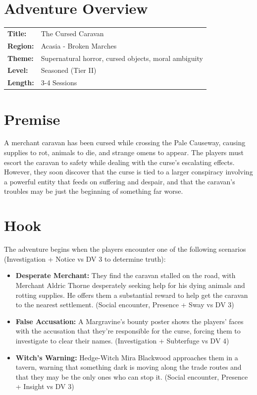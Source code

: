 \documentclass[11pt]{article}
\begin{document}


\section*{Adventure Overview}

\begin{tabularx}{\textwidth}{@{}lX@{}}
\textbf{Title:} & The Cursed Caravan \\
\textbf{Region:} & Acasia - Broken Marches \\
\textbf{Theme:} & Supernatural horror, cursed objects, moral ambiguity \\
\textbf{Level:} & Seasoned (Tier II) \\
\textbf{Length:} & 3-4 Sessions \\
\end{tabularx}


\section{Premise}

A merchant caravan has been cursed while crossing the Pale Causeway, causing supplies to rot, animals to die, and strange omens to appear. The players must escort the caravan to safety while dealing with the curse's escalating effects. However, they soon discover that the curse is tied to a larger conspiracy involving a powerful entity that feeds on suffering and despair, and that the caravan's troubles may be just the beginning of something far worse.

\section{Hook}

The adventure begins when the players encounter one of the following scenarios (Investigation + Notice vs DV 3 to determine truth):
\begin{itemize}
\item \textbf{Desperate Merchant:} They find the caravan stalled on the road, with Merchant Aldric Thorne desperately seeking help for his dying animals and rotting supplies. He offers them a substantial reward to help get the caravan to the nearest settlement. (Social encounter, Presence + Sway vs DV 3)
\item \textbf{False Accusation:} A Margravine's bounty poster shows the players' faces with the accusation that they're responsible for the curse, forcing them to investigate to clear their names. (Investigation + Subterfuge vs DV 4)
\item \textbf{Witch's Warning:} Hedge-Witch Mira Blackwood approaches them in a tavern, warning that something dark is moving along the trade routes and that they may be the only ones who can stop it. (Social encounter, Presence + Insight vs DV 3)
\end{itemize}
\end{document}
